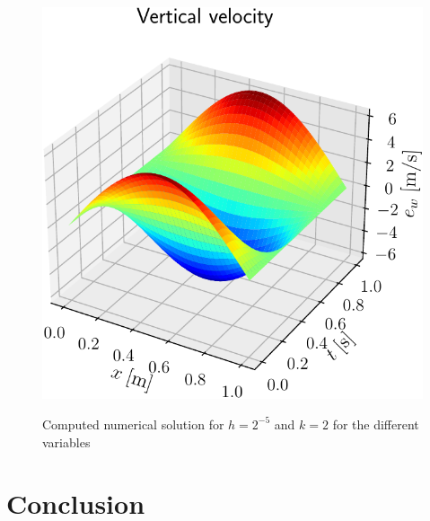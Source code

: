 \documentclass{ifacconf}
\begin{document}
\begin{figure}[ht]
{		\includegraphics[width=0.48\columnwidth]{plot_e_w_cropped.pdf}}%
	\hspace{8pt}%
	 \\
	\caption{Computed numerical solution for $h=2^{-5}$ and $k=2$ for the different variables}%
	\label{fig:plot}%
\end{figure}

\section{Conclusion}
\end{document}
